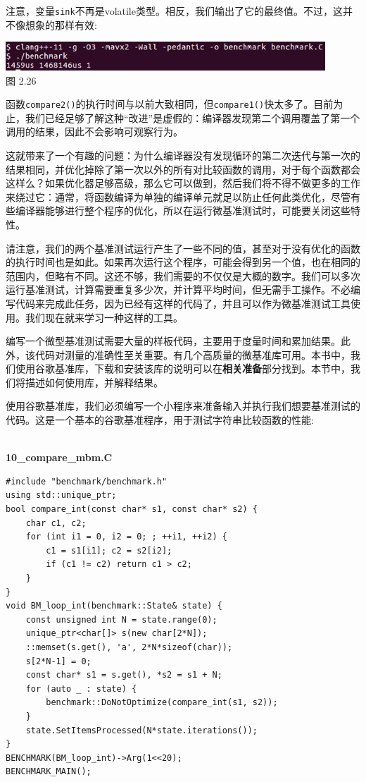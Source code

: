 注意，变量\texttt{sink}不再是volatile类型。相反，我们输出了它的最终值。不过，这并不像想象的那样有效:

\begin{center}
\includegraphics[width=0.9\textwidth]{content/1/chapter2/images/26.jpg}\\
图 2.26
\end{center}

函数\texttt{compare2()}的执行时间与以前大致相同，但\texttt{compare1()}快太多了。目前为止，我们已经足够了解这种“改进”是虚假的：编译器发现第二个调用覆盖了第一个调用的结果，因此不会影响可观察行为。

这就带来了一个有趣的问题：为什么编译器没有发现循环的第二次迭代与第一次的结果相同，并优化掉除了第一次以外的所有对比较函数的调用，对于每个函数都会这样么？如果优化器足够高级，那么它可以做到，然后我们将不得不做更多的工作来绕过它：通常，将函数编译为单独的编译单元就足以防止任何此类优化，尽管有些编译器能够进行整个程序的优化，所以在运行微基准测试时，可能要关闭这些特性。

请注意，我们的两个基准测试运行产生了一些不同的值，甚至对于没有优化的函数的执行时间也是如此。如果再次运行这个程序，可能会得到另一个值，也在相同的范围内，但略有不同。这还不够，我们需要的不仅仅是大概的数字。我们可以多次运行基准测试，计算需要重复多少次，并计算平均时间，但无需手工操作。不必编写代码来完成此任务，因为已经有这样的代码了，并且可以作为微基准测试工具使用。我们现在就来学习一种这样的工具。


编写一个微型基准测试需要大量的样板代码，主要用于度量时间和累加结果。此外，该代码对测量的准确性至关重要。有几个高质量的微基准库可用。本书中，我们使用谷歌基准库，下载和安装该库的说明可以在\textbf{相关准备}部分找到。本节中，我们将描述如何使用库，并解释结果。

使用谷歌基准库，我们必须编写一个小程序来准备输入并执行我们想要基准测试的代码。这是一个基本的谷歌基准程序，用于测试字符串比较函数的性能:

\hspace*{\fill} \\ %
\noindent
\textbf{10\_compare\_mbm.C}
\begin{lstlisting}[style=styleCXX]
#include "benchmark/benchmark.h"
using std::unique_ptr;
bool compare_int(const char* s1, const char* s2) {
	char c1, c2;
	for (int i1 = 0, i2 = 0; ; ++i1, ++i2) {
		c1 = s1[i1]; c2 = s2[i2];
		if (c1 != c2) return c1 > c2;
	}
}
void BM_loop_int(benchmark::State& state) {
	const unsigned int N = state.range(0);
	unique_ptr<char[]> s(new char[2*N]);
	::memset(s.get(), 'a', 2*N*sizeof(char));
	s[2*N-1] = 0;
	const char* s1 = s.get(), *s2 = s1 + N;
	for (auto _ : state) {
		benchmark::DoNotOptimize(compare_int(s1, s2));
	}
	state.SetItemsProcessed(N*state.iterations());
}
BENCHMARK(BM_loop_int)->Arg(1<<20);
BENCHMARK_MAIN();
\end{lstlisting}

